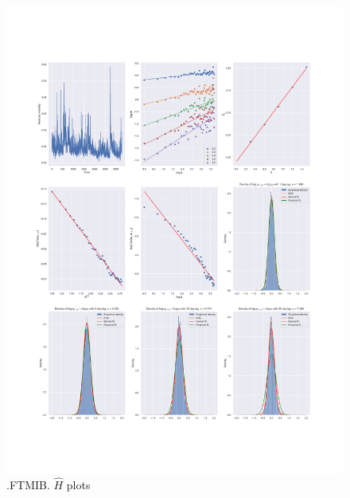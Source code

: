 	\begin{figure}[h]
		\centering
		\includegraphics[width=\linewidth]{fig/.FTMIB.pdf}
		\caption{.FTMIB. $\hat{H}$ plots}
	\end{figure}

